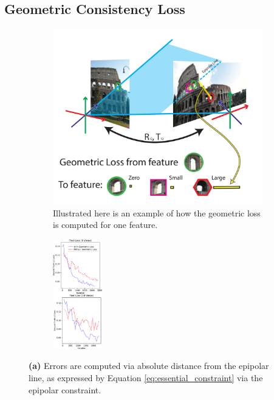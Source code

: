 \documentclass{article} %
\begin{document}
\subsection{Geometric Consistency Loss}

\begin{figure}[t]
\centering
\begin{subfigure}[b]{.60\linewidth}
  \centering
  \includegraphics[width=0.95\linewidth]{figures-GeometricConsistency-v2.pdf}
  \caption{Illustrated here is an example of how the geometric loss is computed for one feature.}
  \label{fig:1b}
  \label{fig:geoconsist}
\end{subfigure}
\begin{subfigure}[b]{.30\textwidth}
  \centering
  \includegraphics[height=180px]{figures-GeometricLoss.pdf}
  \caption{}
  \label{fig:3b}
  \label{fig:geomloss}
\end{subfigure}
\caption{
  \textbf{(a)} Errors are computed via absolute distance from the epipolar line, as expressed by Equation \ref{eq:essential_constraint} via the epipolar constraint.
}
\end{figure}
\end{document}

